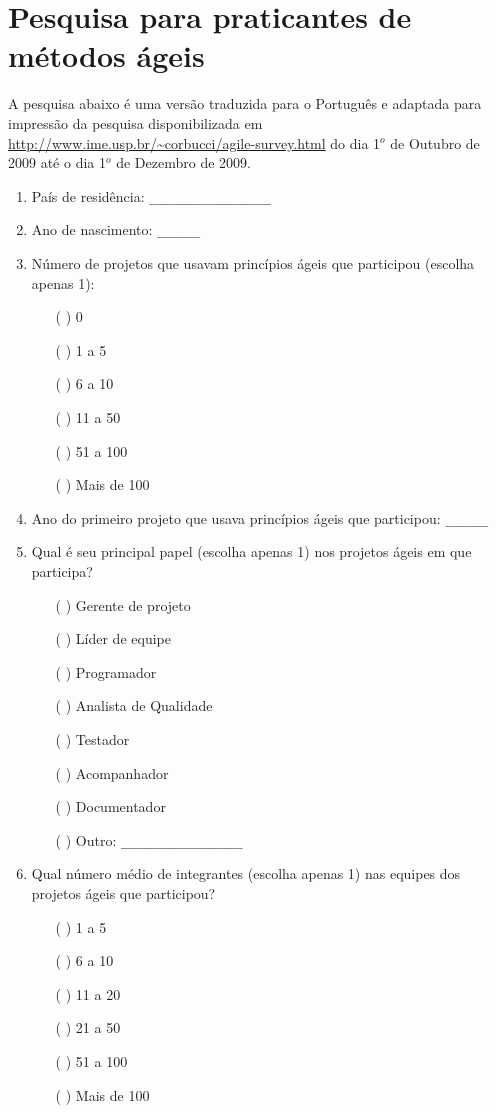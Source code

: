 \chapter{Pesquisa para praticantes de métodos ágeis}
\label{ape:MA}

\singlespacing

A pesquisa abaixo é uma versão traduzida para o Português e adaptada
para impressão da pesquisa disponibilizada em
\url{http://www.ime.usp.br/~corbucci/agile-survey.html} do dia 1$^o$
de Outubro de 2009 até o dia 1$^o$ de Dezembro de 2009.

\begin{enumerate}
\item País de residência: \verb=_________________=

\item Ano de nascimento: \verb=______=

\item Número de projetos que usavam princípios ágeis que participou
  (escolha apenas 1):
  \begin{itemize}
  \item[( )] 0
  \item[( )] 1 a 5
  \item[( )] 6 a 10
  \item[( )] 11 a 50
  \item[( )] 51 a 100
  \item[( )] Mais de 100
  \end{itemize}

\item Ano do primeiro projeto que usava princípios ágeis que
  participou: \verb=______=

\item Qual é seu principal papel (escolha apenas 1) nos projetos ágeis
  em que participa?
  \begin{itemize}
  \item[( )] Gerente de projeto
  \item[( )] Líder de equipe
  \item[( )] Programador
  \item[( )] Analista de Qualidade
  \item[( )] Testador
  \item[( )] Acompanhador
  \item[( )] Documentador
  \item[( )] Outro: \verb=_________________=
  \end{itemize}

\item Qual número médio de integrantes (escolha apenas 1) nas equipes
  dos projetos ágeis que participou?
  \begin{itemize}
  \item[( )] 1 a 5
  \item[( )] 6 a 10
  \item[( )] 11 a 20
  \item[( )] 21 a 50
  \item[( )] 51 a 100
  \item[( )] Mais de 100
  \end{itemize}


\end{enumerate}
